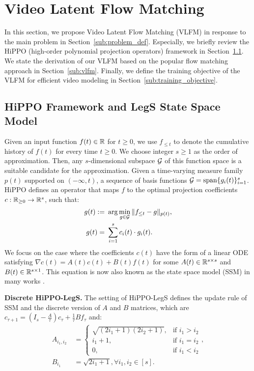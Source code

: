 \section{Video Latent Flow Matching} \label{sec:vlfm}

In this section, we propose Video Latent Flow Matching (VLFM) in response to the main problem in Section~\ref{sub:problem_def}. Especially, we briefly review the HiPPO (high-order polynomial projection operators) framework \cite{gde+20} in Section~\ref{sub:hippo}. We state the derivation of our VLFM based on the popular flow matching approach \cite{lcb+22} in Section~\ref{sub:vlfm}. Finally, we define the training objective of the VLFM for efficient video modeling in Section~\ref{sub:training_objective}.


\subsection{HiPPO Framework and LegS State Space Model}\label{sub:hippo}

Given an input function $f(t) \in \mathbb{R}$ for $t \ge 0$, we use $f_{\leq t}$ to denote the cumulative history of $f(t)$ for every time $t \ge 0$. We choose integer $s \ge 1$ as the order of approximation. Then, any $s$-dimensional subspace ${\cal G}$ of this function space is a suitable candidate for the approximation. Given a time-varying measure family $p(t)$ supported on $(-\infty, t)$, a sequence of basis functions ${\cal G} = {\rm span}\{ g_{i}(t) \}_{i=1}^s$. HiPPO \cite{gde+20} defines an operator that maps $f$ to the optimal projection coefficients $c: \mathbb{R}_{\ge 0} \rightarrow \mathbb{R}^s$, such that:
\begin{align*}
    g(t) := & ~ \arg \min_{g \in {\cal G}} \| f_{\leq t} -  g \|_{p(t)}, \\
    g(t) = & ~ \sum_{i=1}^s c_i(t) \cdot g_i(t).
\end{align*}
We focus on the case where the coefficients $c(t)$ have the form of a linear ODE satisfying $\nabla c(t) = A(t) c(t) + B(t) f(t)$ for some $A(t) \in \mathbb{R}^{s \times s}$ and $B(t) \in \mathbb{R}^{s \times 1}$. This equation is now also known as the state space model (SSM) in many works \cite{kds+15,aia+22,gd23,dg24,zlz+24,xyy+24,mlw24,rx24,sld+24}.

{\bf Discrete HiPPO-LegS.} The setting of HiPPO-LegS defines the update rule of SSM and the discrete version of $A$ and $B$ matrices, which are $c_{\tau + 1} = (I_s - \frac{A}{\tau}) c_\tau + \frac{1}{\tau} B f_\tau$ and:
\begin{align*}
    A_{i_1, i_2} & ~ = \begin{cases}
        \sqrt{(2i_1 + 1)(2i_2 + 1)}, & \text{if $i_1 > i_2$} \\
        i_1 + 1, & \text{if $i_1 = i_2$} \\
        0, & \text{if $i_1 < i_2$}
    \end{cases}, \\
    B_{i_1} & ~ = \sqrt{2i_1 + 1}, \forall i_1, i_2 \in [s].
\end{align*}

